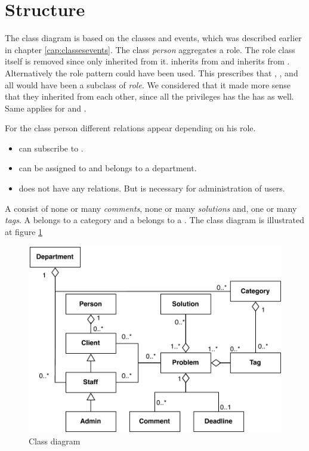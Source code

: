 \section{Structure}
\label{sec:problem_structure}
The class diagram is based on the classes and events, which was described earlier in chapter \ref{cap:classesevents}. The class \textit{person} aggregates a role. The role class itself is removed since only \class{\client[]} inherited from it. \staff[ci] inherits from \class{\client[]} and \class{\admin[]} inherits from \cl{\client[]}. Alternatively the role pattern \cite[p. 80]{roedeaalborg} could have been used. This prescribes that \class{\admin[]}, \class{\client[]}, and \class{\staff[]} all would have been a subclass of \textit{role}. We considered that it made more sense that they inherited from each other, since all the privileges \class{\staff[]} has the \class{\admin[]} has as well. Same applies for \class{\staff[]} and \cl{\client[]}.  

For the class person different relations appear depending on his role. 
\begin{itemize}
\item {} can subscribe to .
\item \staff[ci] can be assigned to  and \class{\staff[]} belongs to a department. 
\item \class{\admin[]} does not have any relations. But is necessary for administration of users.  
\end{itemize}

A \problem[] consist of none or many \textit{comments}, none or many \textit{solutions} and, one or many \textit{tags}. A  belongs to a category and a  belongs to a .  The class diagram is illustrated at figure \ref{fig:pdaclassdiagram}

\begin{figure}
\begin{center}
\includegraphics[scale=0.6]{input/problem_domain_analysis/newest_class_diagram.pdf}
\caption{Class diagram}
\label{fig:pdaclassdiagram}
\end{center}
\end{figure}